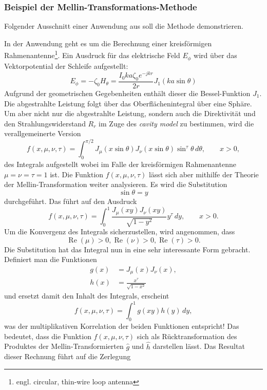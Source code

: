 \subsubsection{Beispiel der Mellin-Transformations-Methode}
Folgender Ausschnitt einer Anwendung aus 
\cite{mellin:mellin-transform-method} soll die Methode demonstrieren.

In der Anwendung geht es um die Berechnung einer kreisförmigen 
Rahmenantenne\footnote{engl. circular, thin-wire loop antenna}.
%
%
Ein Ausdruck für das elektrische Feld $E_\phi $ wird über das 
Vektorpotential der Schleife aufgestellt:
\[
    E_\phi 
    = -\zeta_0 H_\theta  
    = \frac{I_0ka\zeta_0e^{-jkr}}{2r} J_1(ka \sin\theta)
\]
Aufgrund der geometrischen Gegebenheiten enthält dieser die 
Bessel-Funktion $J_1$.
Die abgestrahlte Leistung folgt über das Oberflächenintegral 
über eine Sphäre.
Um aber nicht nur die abgestrahlte Leistung, sondern auch die 
Direktivität und den Strahlungswiderstand $R_r$ im Zuge des 
{\em cavity model} zu bestimmen, wird die verallgemeinerte Version 
\[
    f(x, \mu, \nu, \tau)
    = \int_{0}^{\pi/2} J_\mu(x \sin\theta) J_\nu(x \sin\theta) 
    \sin^\tau \theta \,d\theta, \qquad x > 0 
    ,
\]
des Integrals aufgestellt wobei im Falle der kreisförmigen 
Rahmenantenne $\mu = \nu = \tau = 1$ ist.
Die Funktion $f(x, \mu, \nu, \tau)$ lässt sich aber mithilfe der 
Theorie der Mellin-Transformation weiter analysieren.
Es wird die Substitution
\[
    \sin\theta = y
\]
durchgeführt.
Das führt auf den Ausdruck
\[
    f(x, \mu, \nu, \tau)
    = \int_{0}^{1} \frac{J_\mu(xy) J_\nu(xy)}{\sqrt{1-y^2}} y^\tau \,dy, 
    \qquad x > 0 
    .
\]
Um die Konvergenz des Integrals sicherzustellen, wird angenommen, dass
\[
    \operatorname{Re}(\mu) > 0,
    \operatorname{Re}(\nu) > 0,
    \operatorname{Re}(\tau) > 0.
\]
Die Substitution hat das Integral nun in eine sehr 
interessante Form gebracht.
Definiert man die Funktionen 
\begin{align*}
    g(x) &= J_\mu(x)J_\nu(x), \\
    h(x) &= \frac{x^\tau}{\sqrt{1-x^2}} 
\end{align*}
und ersetzt damit den Inhalt des Integrals, erscheint
\[
    f(x, \mu, \nu, \tau)
    = \int_{0}^{1} g(xy) h(y) \,dy, 
\]
was der multiplikativen Korrelation der beiden Funktionen entspricht!
Das bedeutet, dass die Funktion $f(x, \mu, \nu, \tau)$ sich als 
Rücktransformation des Produktes der Mellin-Transformierten $\hat{g}$ 
und $\hat{h}$ darstellen lässt.
Das Resultat dieser Rechnung führt auf die Zerlegung 
